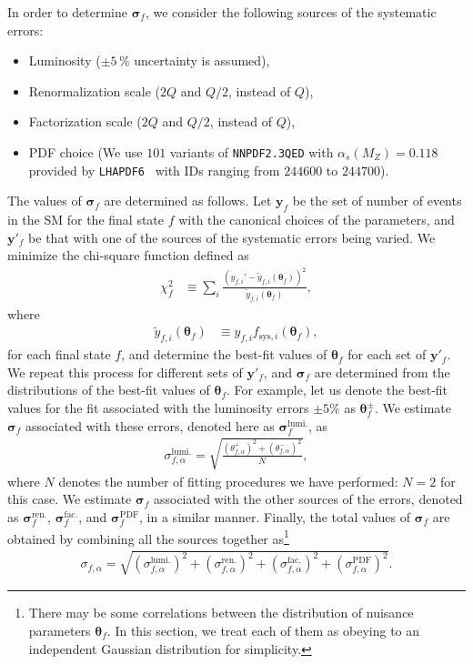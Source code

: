 \documentclass[12pt,twoside,book]{article}
\begin{document}
In order to determine $\bm{\sigma}_f$, we consider the following sources of the systematic errors:
\begin{itemize}
  \item Luminosity ($\pm 5\,\%$ uncertainty is assumed),
  \item Renormalization scale ($2Q$ and $Q/2$, instead of $Q$),
  \item Factorization scale ($2Q$ and $Q/2$, instead of $Q$),
  \item PDF choice (We use $101$ variants of \texttt{NNPDF2.3QED} with $\alpha_s (M_Z) = 0.118$~\cite{Ball:2013hta} provided by \texttt{LHAPDF6}~\cite{Buckley:2014ana} with IDs ranging from $244600$ to $244700$).
\end{itemize}
The values of $\bm{\sigma}_f$ are determined as follows.
Let $\bm{y}_f$ be the set of number of events in the SM for the final state $f$ with the canonical choices of the parameters, and $\bm{y}'_f$ be that with one of the sources of the systematic errors being varied.
We minimize the chi-square function defined as
\begin{align}
  \chi^2_f &\equiv \sum_i \frac
  {\left( y_{f,i}' - \tilde{y}_{f,i} (\bm{\theta}_f) \right)^2}
  {\tilde{y}_{f,i} (\bm{\theta}_f)},
\end{align}
where
\begin{align}
  \tilde{y}_{f,i} (\bm{\theta}_f) &\equiv
  y_{f,i} f_{\mathrm{sys},i} (\bm{\theta}_f),
\end{align}
for each final state $f$, and determine the best-fit values of $\bm{\theta}_f$ for each set of $\bm{y}'_f$.
We repeat this process for different sets of $\bm{y}'_f$, and $\bm{\sigma}_f$ are determined from the distributions of the best-fit values of $\bm{\theta}_f$.
For example, let us denote the best-fit values for the fit associated with the luminosity errors $\pm 5\%$ as $\bm{\theta}_f^{\pm}$.
We estimate $\bm{\sigma}_f$ associated with these errors, denoted here as $\bm{\sigma}_f^{\mathrm{lumi.}}$, as
\begin{align}
  \sigma_{f,\alpha}^{\mathrm{lumi.}} = \sqrt{\frac{(\theta_{f,\alpha}^{+})^2 + (\theta_{f,\alpha}^{-})^2}{N}},
\end{align}
where $N$ denotes the number of fitting procedures we have performed: $N=2$ for this case.
We estimate $\bm{\sigma}_f$ associated with the other sources of the errors, denoted as $\bm{\sigma}_f^{\mathrm{ren.}}$, $\bm{\sigma}_f^{\mathrm{fac.}}$, and $\bm{\sigma}_f^{\mathrm{PDF}}$, in a similar manner.
Finally, the total values of $\bm{\sigma}_f$ are obtained by combining all the sources together as\footnote
{
  There may be some correlations between the distribution of nuisance parameters $\bm{\theta}_{f}$.
  In this section, we treat each of them as obeying to an independent Gaussian distribution for simplicity.
}
\begin{align}
  \sigma_{f,\alpha} = \sqrt{(\sigma_{f,\alpha}^{\mathrm{lumi.}})^2
  + (\sigma_{f,\alpha}^{\mathrm{ren.}})^2
  + (\sigma_{f,\alpha}^{\mathrm{fac.}})^2
  + (\sigma_{f,\alpha}^{\mathrm{PDF}})^2}.
  \label{eq_comb_sig}
\end{align}
\end{document}
